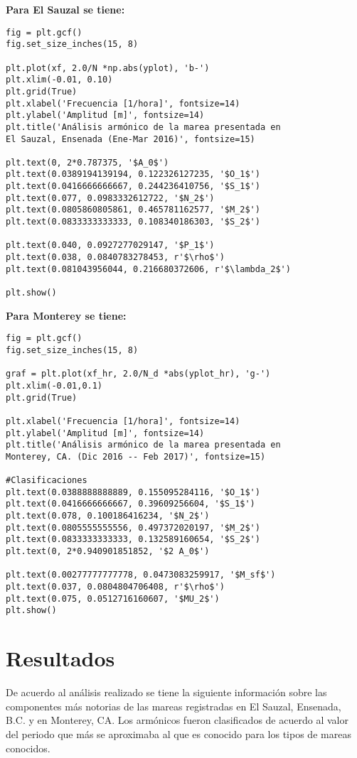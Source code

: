 \textbf{Para El Sauzal se tiene:}
\begin{verbatim}
fig = plt.gcf()
fig.set_size_inches(15, 8)

plt.plot(xf, 2.0/N *np.abs(yplot), 'b-')
plt.xlim(-0.01, 0.10) 
plt.grid(True)
plt.xlabel('Frecuencia [1/hora]', fontsize=14)
plt.ylabel('Amplitud [m]', fontsize=14)
plt.title('Análisis armónico de la marea presentada en
El Sauzal, Ensenada (Ene-Mar 2016)', fontsize=15)

plt.text(0, 2*0.787375, '$A_0$')
plt.text(0.0389194139194, 0.122326127235, '$O_1$')
plt.text(0.0416666666667, 0.244236410756, '$S_1$')
plt.text(0.077, 0.0983332612722, '$N_2$')
plt.text(0.0805860805861, 0.465781162577, '$M_2$')
plt.text(0.0833333333333, 0.108340186303, '$S_2$')

plt.text(0.040, 0.0927277029147, '$P_1$')
plt.text(0.038, 0.0840783278453, r'$\rho$')
plt.text(0.081043956044, 0.216680372606, r'$\lambda_2$')

plt.show()
\end{verbatim}

\textbf{Para Monterey se tiene:}
\begin{verbatim}
fig = plt.gcf()
fig.set_size_inches(15, 8)

graf = plt.plot(xf_hr, 2.0/N_d *abs(yplot_hr), 'g-')
plt.xlim(-0.01,0.1)
plt.grid(True)

plt.xlabel('Frecuencia [1/hora]', fontsize=14)
plt.ylabel('Amplitud [m]', fontsize=14)
plt.title('Análisis armónico de la marea presentada en 
Monterey, CA. (Dic 2016 -- Feb 2017)', fontsize=15)

#Clasificaciones
plt.text(0.0388888888889, 0.155095284116, '$O_1$')
plt.text(0.0416666666667, 0.39609256604, '$S_1$')
plt.text(0.078, 0.100186416234, '$N_2$')
plt.text(0.0805555555556, 0.497372020197, '$M_2$')
plt.text(0.0833333333333, 0.132589160654, '$S_2$')
plt.text(0, 2*0.940901851852, '$2 A_0$')

plt.text(0.00277777777778, 0.0473083259917, '$M_sf$')
plt.text(0.037, 0.0804804706408, r'$\rho$')
plt.text(0.075, 0.0512716160607, '$MU_2$')
plt.show()
\end{verbatim}

\newpage
\section{Resultados}
De acuerdo al análisis realizado se tiene la siguiente información sobre las componentes más notorias de las mareas registradas en El Sauzal, Ensenada, B.C. y en Monterey, CA. Los armónicos fueron clasificados de acuerdo al valor del periodo que más se aproximaba al que es conocido para los tipos de mareas conocidos.

